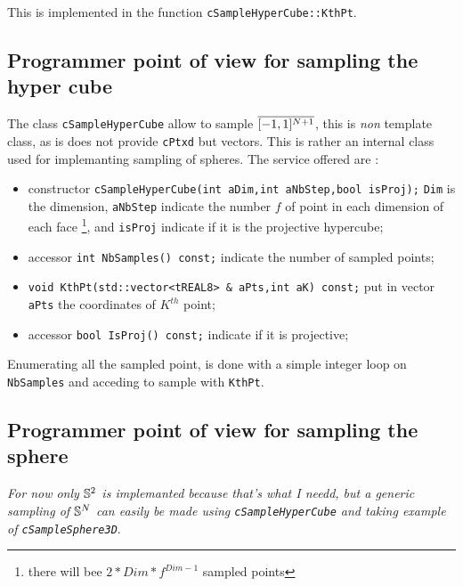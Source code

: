 This is implemented in the function {\tt cSampleHyperCube::KthPt}.


\subsection{Programmer point of view for sampling the hyper cube}

The class {\tt cSampleHyperCube} allow to sample $\overline{[-1,1]^{N +1}}$,
this is \emph{non} template class, as is does not provide
{\tt cPtxd} but vectors.  This is rather an internal class
used for implemanting sampling of spheres.
The service offered are :

\begin{itemize}
   \item constructor {\tt cSampleHyperCube(int aDim,int aNbStep,bool isProj);}
         {\tt Dim} is the dimension,  {\tt aNbStep} indicate the number $f$
         of point in each dimension of each face 
         \footnote{there will bee $ 2* Dim * f^{Dim-1}$ sampled points},
         and {\tt isProj} indicate if it is the projective hypercube;

   \item accessor {\tt  int NbSamples() const;} indicate the number of sampled points;

   \item {\tt void  KthPt(std::vector<tREAL8> \& aPts,int aK) const;} put in vector
         {\tt aPts} the coordinates of $K^{th}$ point;

    \item accessor {\tt bool IsProj() const;} indicate if it is projective;
\end{itemize}

Enumerating all the sampled point, is done with a simple integer loop on
{\tt NbSamples} and acceding to sample with {\tt KthPt}.


\subsection{Programmer point of view for sampling the sphere}
\label{HeurOpt:ProjSph}

\emph{For now only $\mathbb{S}^2$ is implemanted because that's what I needd, but a generic sampling 
of $\mathbb{S}^N$ can easily be made using {\tt cSampleHyperCube} and taking example of {\tt cSampleSphere3D}}.


